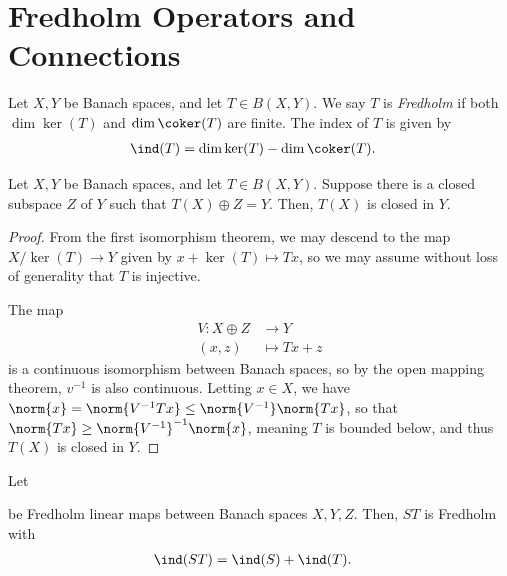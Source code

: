 \documentclass[10pt]{mypackage}
\begin{document}
\section{Fredholm Operators and Connections}%
\begin{definition}
  Let $X,Y$ be Banach spaces, and let $T\in B(X,Y)$. We say $T$ is \textit{Fredholm} if both $\dim\ker(T)$ and $\dim\coker(T)$ are finite. The index of $T$ is given by
  \begin{align*}
  \ind(T) &= \dim\ker(T)-\dim\coker(T).
  \end{align*}
\end{definition}
\begin{theorem}
  Let $X,Y$ be Banach spaces, and let $T\in B(X,Y)$. Suppose there is a closed subspace $Z$ of $Y$ such that $T(X)\oplus Z = Y$. Then, $T(X)$ is closed in $Y$.
\end{theorem}
\begin{proof}
  From the first isomorphism theorem, we may descend to the map $X/\ker(T)\rightarrow Y$ given by $x + \ker(T) \mapsto Tx$, so we may assume without loss of generality that $T$ is injective.

  The map
  \begin{align*}
    V\colon X\oplus Z &\rightarrow Y\\
    \left( x,z \right) &\mapsto Tx + z
  \end{align*}
  is a continuous isomorphism between Banach spaces, so by the open mapping theorem, $v^{-1}$ is also continuous. Letting $x\in X$, we have $\norm{x} = \norm{V^{-1}Tx}\leq \norm{V^{-1}}\norm{Tx}$, so that $\norm{Tx} \geq \norm{V^{-1}}^{-1}\norm{x}$, meaning $T$ is bounded below, and thus $T(X)$ is closed in $Y$.
\end{proof}
\begin{theorem}
  Let 
  \begin{center}
  \end{center}
  be Fredholm linear maps between Banach spaces $X,Y,Z$. Then, $ST$ is Fredholm with
  \begin{align*}
    \ind(ST) &= \ind(S) + \ind(T).
  \end{align*}
\end{theorem}
\end{document}
